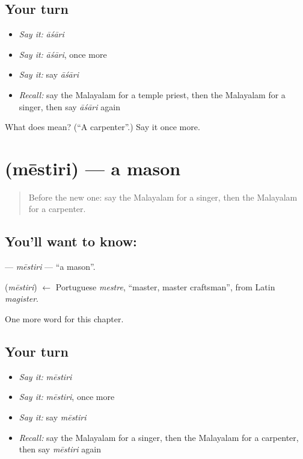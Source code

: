 \subsection*{Your turn}
\begin{itemize}
\raggedright
  \item \emph{Say it:} \emph{āśāri}
  \item \emph{Say it:} \emph{āśāri}, once more
  \item \emph{Say it:} say \emph{āśāri}
  \item \emph{Recall:} say the Malayalam for a temple priest, then the Malayalam for a singer, then say \emph{āśāri} again
\end{itemize}

\begin{tcolorbox}[breakable,colback=teal!4,colframe=teal!35!black,title={Before you move on}]
What does  mean? (\textquotedblleft{}A carpenter\textquotedblright{}.) Say it once more.
\end{tcolorbox}
\section[\texorpdfstring{\ml{മേസ്തിരി} (mēstiri)}{മേസ്തിരി (mēstiri)}]{ (mēstiri) — a mason}

\label{lesson:ML-C263-mestiri}



\begin{quote}
Before the new one: say the Malayalam for a singer, then the Malayalam for a carpenter.
\end{quote}

\subsection*{You'll want to know: }
\textbf{} — \emph{mēstiri} — \textquotedblleft{}a mason\textquotedblright{}.

\begin{cousinweb}
\textbf{} (\emph{mēstiri}) $\leftarrow$ Portuguese \emph{mestre}, \textquotedblleft{}master, master craftsman\textquotedblright{}, from Latin \emph{magister}.
\end{cousinweb}

\begin{grammarlens}[title={What you've built}]
One more word for this chapter.
\end{grammarlens}

\subsection*{Your turn}
\begin{itemize}
\raggedright
  \item \emph{Say it:} \emph{mēstiri}
  \item \emph{Say it:} \emph{mēstiri}, once more
  \item \emph{Say it:} say \emph{mēstiri}
  \item \emph{Recall:} say the Malayalam for a singer, then the Malayalam for a carpenter, then say \emph{mēstiri} again
\end{itemize}

